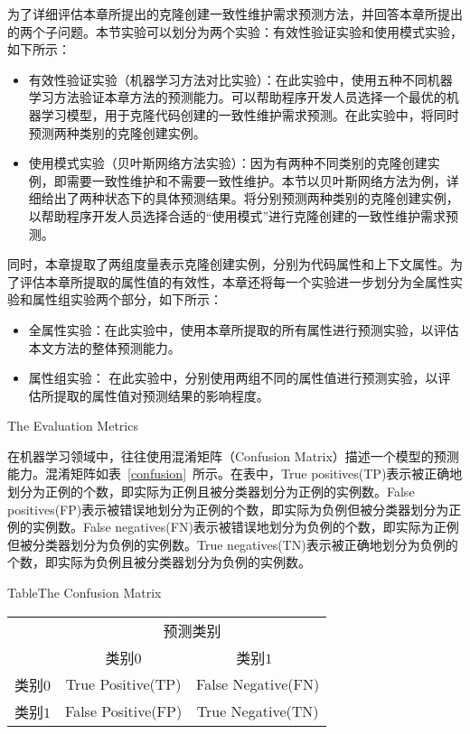 为了详细评估本章所提出的克隆创建一致性维护需求预测方法，并回答本章所提出的两个子问题。本节实验可以划分为两个实验：有效性验证实验和使用模式实验，如下所示：
\begin{itemize}
\item
有效性验证实验（机器学习方法对比实验）：在此实验中，使用五种不同机器学习方法验证本章方法的预测能力。可以帮助程序开发人员选择一个最优的机器学习模型，用于克隆代码创建的一致性维护需求预测。在此实验中，将同时预测两种类别的克隆创建实例。
\item
使用模式实验（贝叶斯网络方法实验）：因为有两种不同类别的克隆创建实例，即需要一致性维护和不需要一致性维护。本节以贝叶斯网络方法为例，详细给出了两种状态下的具体预测结果。将分别预测两种类别的克隆创建实例，以帮助程序开发人员选择合适的“使用模式”进行克隆创建的一致性维护需求预测。
\end{itemize}

同时，本章提取了两组度量表示克隆创建实例，分别为代码属性和上下文属性。为了评估本章所提取的属性值的有效性，本章还将每一个实验进一步划分为全属性实验和属性组实验两个部分，如下所示：
\begin{itemize}
\item
全属性实验：在此实验中，使用本章所提取的所有属性进行预测实验，以评估本文方法的整体预测能力。
\item
属性组实验：
在此实验中，分别使用两组不同的属性值进行预测实验，以评估所提取的属性值对预测结果的影响程度。
\end{itemize}

{The Evaluation Metrics}
\label{ref-creatingmetrics}

在机器学习领域中，往往使用混淆矩阵（Confusion Matrix）描述一个模型的预测能力。混淆矩阵如表~\ref{confusion}~所示。在表中，True positives(TP)表示被正确地划分为正例的个数，即实际为正例且被分类器划分为正例的实例数。False positives(FP)表示被错误地划分为正例的个数，即实际为负例但被分类器划分为正例的实例数。False negatives(FN)表示被错误地划分为负例的个数，即实际为正例但被分类器划分为负例的实例数。True negatives(TN)表示被正确地划分为负例的个数，即实际为负例且被分类器划分为负例的实例数。　　​

\begin{table}[htbp]
{Table$\!$}{The Confusion Matrix}
\vspace{0.5em}
\centering
\wuhao
\begin{tabular}{ccc}
\toprule[1.5pt]
~\multirow{2}{*}{真实类别}& \multicolumn{2}{c}{预测类别} ~\\ 
 \cline{2-3}
~&{类别$0$} &{类别$1$}~\\
\midrule[1pt]
类别$0$&True Positive(TP)	&False Negative(FN)\\
类别$1$&False Positive(FP)	&True Negative(TN)\\
\bottomrule[1.5pt]
\end{tabular}
\end{table}

